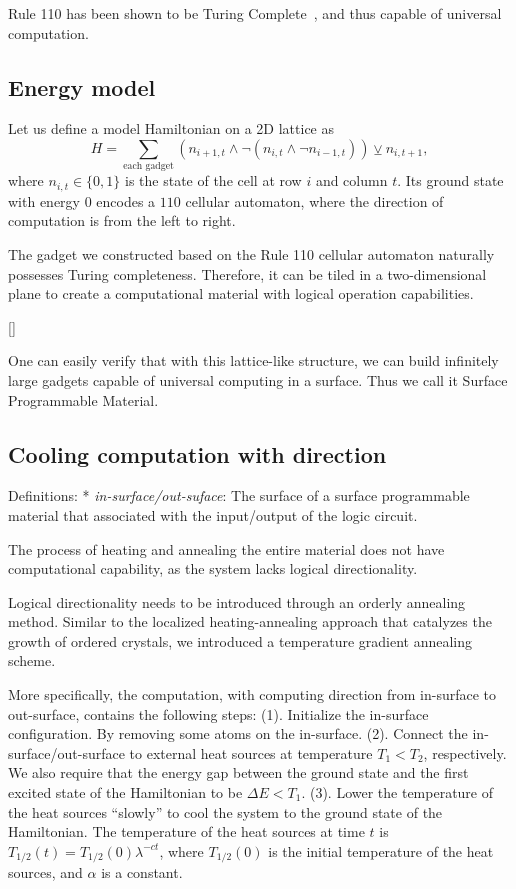 \documentclass[twocolumn,superscriptaddress,english,showpacs,longbibliography]{revtex4-2}
\newcommand{\jgl}[1]{[{\color{green}{JGL: #1}}]}
\begin{document}
Rule 110 has been shown to be Turing Complete~\cite{Cook2009}, and thus capable of universal
computation.

\subsection{Energy model}\label{a-2d-surface-programmable-material}

Let us define a model Hamiltonian on a 2D lattice as
\begin{equation}\label{eq:toy-hamiltonian}
H = \sum_{\text{each gadget}} (n_{i+1, t} \land \neg(n_{i, t} \land \neg n_{i-1, t})) \veebar n_{i,t+1},
\end{equation}
where $n_{i, t} \in \{0, 1\}$ is the state of the cell at row $i$ and column $t$.
Its ground state with energy $0$ encodes a $110$ cellular automaton, where the direction of computation is from the left to right.

The gadget we constructed based on the Rule 110 cellular automaton
naturally possesses Turing completeness. Therefore, it can be tiled in a
two-dimensional plane to create a computational material with logical
operation capabilities.

\jgl{We need a main figure to show the tiling and cooling.}

One can easily verify that with this lattice-like structure, we can
build infinitely large gadgets capable of universal computing in a
surface. Thus we call it Surface Programmable Material.

\subsection{Cooling computation with direction}\label{sec:direction}

Definitions: * \emph{in-surface/out-suface}: The surface of a surface
programmable material that associated with the input/output of the logic
circuit.

The process of heating and annealing the entire material does not have computational capability, as the system lacks logical directionality.

Logical directionality needs to be introduced through an orderly annealing method. 
Similar to the localized heating-annealing approach that catalyzes the growth of ordered crystals, we introduced a temperature gradient annealing scheme.

More specifically, the computation, with computing direction from in-surface to out-surface, contains the following steps: (1). Initialize the in-surface configuration. By removing
some atoms on the in-surface. (2). Connect the in-surface/out-surface to
external heat sources at temperature $T_1 < T_2$, respectively. We
also require that the energy gap between the ground state and the first
excited state of the Hamiltonian to be $\Delta E< T_1$. (3). Lower the
temperature of the heat sources ``slowly'' to cool the system to the
ground state of the Hamiltonian. The temperature of the heat sources at
time $t$ is $T_{1/2}(t) = T_{1/2}(0)\lambda^{-c t}$, where
$T_{1/2}(0)$ is the initial temperature of the heat sources, and
$\alpha$ is a constant.
\end{document}
